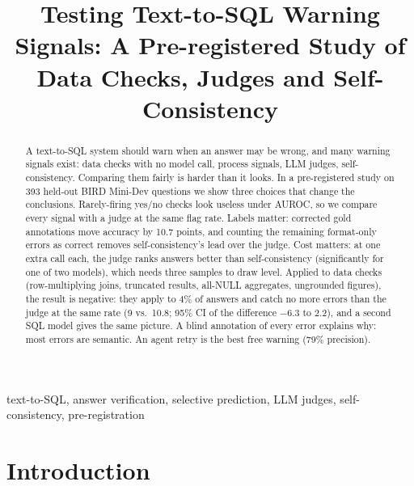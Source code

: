 \documentclass[conference]{IEEEtran}
\begin{document}
\title{Testing Text-to-SQL Warning Signals: A Pre-registered Study of Data Checks, Judges and Self-Consistency}

\author{
}

\maketitle

\begin{abstract}
A text-to-SQL system should warn when an answer may be wrong, and many warning signals exist: data
checks with no model call, process signals, LLM judges, self-consistency. Comparing them fairly is
harder than it looks. In a pre-registered study on 393 held-out BIRD Mini-Dev questions we show three
choices that change the conclusions. Rarely-firing yes/no checks look useless under AUROC, so we
compare every signal with a judge at the same flag rate. Labels matter: corrected gold annotations
move accuracy by 10.7 points, and counting the remaining format-only errors as correct removes
self-consistency's lead over the judge. Cost matters: at one extra call each, the judge ranks answers
better than self-consistency (significantly for one of two models), which needs three samples to
draw level. Applied to data checks (row-multiplying
joins, truncated results, all-NULL aggregates, ungrounded figures), the result is negative: they apply
to 4\% of answers and catch no more errors than the judge at the same rate (9 vs.\ 10.8; 95\% CI of
the difference $-6.3$ to $2.2$), and a second SQL model gives the same picture. A blind annotation of
every error explains why: most errors are semantic. An agent retry is the best free warning (79\%
precision).
\end{abstract}

\begin{IEEEkeywords}
text-to-SQL, answer verification, selective prediction, LLM judges, self-consistency, pre-registration
\end{IEEEkeywords}

\section{Introduction}
\end{document}
